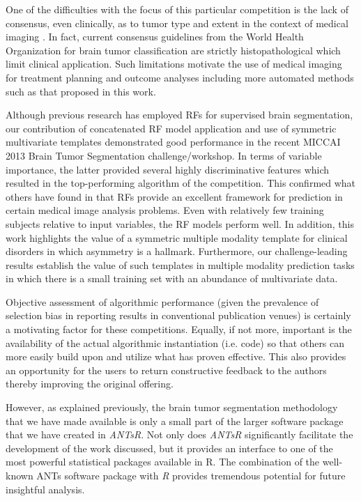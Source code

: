 One of the difficulties with the focus of this particular competition 
is the lack of consensus, even clinically, as to tumor type and extent
in the context of medical imaging \citep{cha2005}.  In fact, current 
consensus guidelines from the World Health Organization for brain 
tumor classification are strictly histopathological \citep{louis2007}
which limit clinical application.  Such limitations motivate the
use of medical imaging for treatment planning and outcome analyses 
\citep{cha2005} including more automated methods such as that proposed
in this work.

Although previous research has employed RFs for supervised brain
segmentation, our contribution of concatenated RF model application and use
of symmetric multivariate templates demonstrated good performance 
in the recent MICCAI 2013 Brain Tumor Segmentation challenge/workshop.  
In terms of variable importance, the latter provided several highly 
discriminative features which resulted in the top-performing algorithm 
of the competition.  This confirmed what others have found in that
RFs provide an excellent framework for prediction in certain
medical image analysis problems.  Even with relatively few training
subjects relative to input variables, the RF models
perform well.
In addition, this work highlights the value of  a symmetric multiple
modality template for clinical disorders in which asymmetry is a
hallmark.  Furthermore, our challenge-leading results establish the
value of such templates in multiple modality prediction
tasks in which there is a small training set with an abundance of
multivariate data.

Objective assessment  of algorithmic performance (given the prevalence of selection bias
in reporting results in conventional publication venues) is certainly a motivating
factor for these competitions. Equally, if not more, important
is the availability of the actual algorithmic instantiation (i.e. code) so that
others can more easily build upon and utilize what has proven effective. 
This also provides an opportunity for the users to return
constructive feedback to the authors thereby improving the original offering.  

However, as explained previously, the brain tumor segmentation 
methodology that we have made available is only a small part of the 
larger software package that we have created in \textit{ANTsR}.  Not only does
\textit{ANTsR} significantly facilitate the development of the work discussed,
but it provides an interface to one of the most powerful statistical
packages available in R.  The combination of the well-known ANTs software
package with \textit{R} provides tremendous potential for future insightful analysis.









